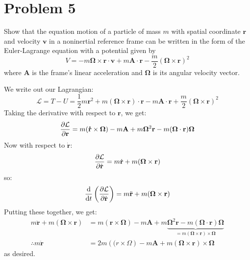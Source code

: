 \documentclass[10pt]{article}
\begin{document}
	\pagebreak
	\section*{Problem 5}
	Show that the equation motion of a particle of mass $m$ with spatial coordinate $\mathbf r$ and velocity 
	$\mathbf v$ in a noninertial reference frame can be written in the form of the Euler-Lagrange equation with a
	potential given by 
	\[
		V = -m\mathbf{\Omega} \times \mathbf{r \cdot v} + m\mathbf{A \cdot r} - \frac{m}{2}(\mathbf{\Omega \times
		r})^2
	\] 
	where $\mathbf A$ is the frame's linear acceleration and $\mathbf \Omega$ is its angular velocity vector. 

	\begin{solution}
		We write out our Lagrangian: 
		\[
			\mathcal L = T - U = \frac{1}{2}m \mathbf r^2 + m(\mathbf{\Omega \times r}) \cdot \mathbf r - m
			\mathbf{A \cdot r} + \frac{m}{2}(\mathbf{\Omega \times r})^2
		\] 
		Taking the derivative with respect to $\mathbf r$, we get: 
		\[
		\pdv{\mathcal L}{\mathbf r} = m(\mathbf{\dot r \times \Omega}) - m\mathbf A + m\mathbf{\Omega}^2 \mathbf
		r
			- m(\mathbf{\Omega \cdot r}) \mathbf{\Omega}
		\] 
		Now with respect to $\dot{\mathbf r}$:
		\[
			\pdv{\mathcal L}{\dot{\mathbf r}} = m\dot{\mathbf r} + m(\mathbf{\Omega \times r}) 
		\] 
		so: 
		\[
			\dv{t}\left( \pdv{\mathcal L}{\dot{\mathbf r}} \right) = m\ddot{\mathbf r} + m(\mathbf{\Omega \times
			r})
		\] 
		Putting these together, we get: 
		\begin{align*}
			m\ddot{\mathbf r} + m(\mathbf{\Omega \times r}) &= m(\mathbf{r \times \Omega}) - m\mathbf A + m
			\underbrace{\mathbf{\Omega}^2 \mathbf r - m(\mathbf{\Omega \cdot r})\mathbf \Omega}_{= m(\mathbf{
			\Omega \times r}) \times \mathbf \Omega}\\
			\therefore m\ddot{\mathbf r} &= 2m(\mathbf(r \times \Omega) - m\mathbf A +
			m(\mathbf{\Omega \times r}) \times \mathbf{\Omega}
		\end{align*}
		as desired. 
	\end{solution}
\end{document}
